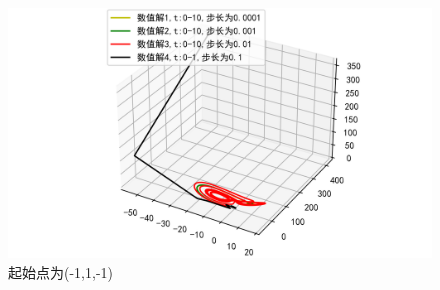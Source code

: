 \documentclass[a4paper]{article}%
\begin{document}
\begin{figure}[H]
    \centering
    \includegraphics[scale=0.8]{65}
    \caption{起始点为(-1,1,-1)}
\end{figure}
\end{document}
